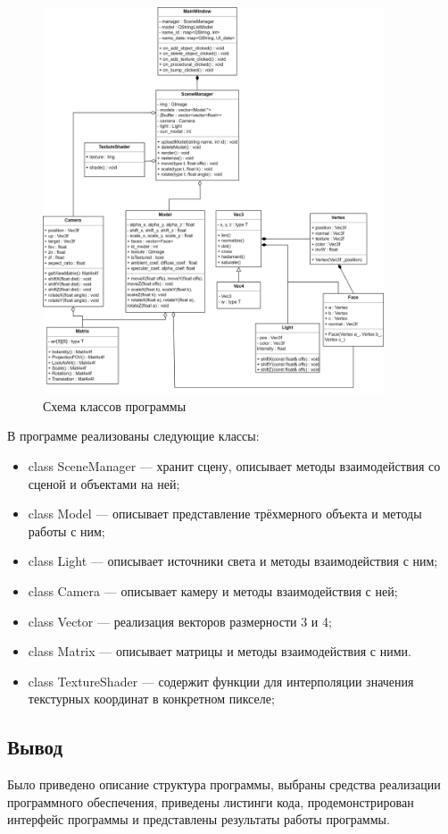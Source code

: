\begin{figure}[h]
	\centering
	\includegraphics[width=0.9\textwidth]{img/algorithms/struct.png}
	\caption{Схема классов программы}
	\label{fig:struct}
\end{figure}
\clearpage
В программе реализованы следующие классы:
\begin{itemize}
	\item class SceneManager --- хранит сцену, описывает методы взаимодействия со сценой и объектами на ней;
	\item class Model --- описывает представление трёхмерного объекта и методы работы с ним;
	\item class Light --- описывает источники света и методы взаимодействия с ним;
	\item class Camera --- описывает камеру и методы взаимодействия с ней;
	\item class Vector --- реализация векторов размерности 3 и 4;
	\item class Matrix --- описывает матрицы и методы взаимодействия с ними.
	\item class TextureShader --- содержит функции для интерполяции значения текстурных координат в конкретном пикселе;
\end{itemize}

\subsection*{Вывод}
Было приведено описание структура программы, выбраны средства реализации программного обеспечения, приведены листинги кода, продемонстрирован интерфейс программы и представлены результаты работы программы. 
